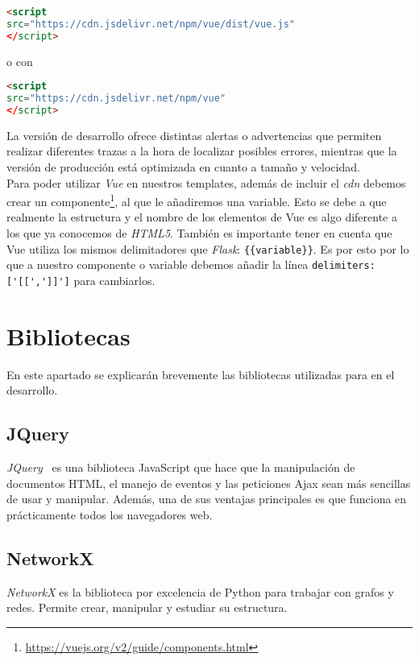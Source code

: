 \renewcommand{\lstlistingname}{Vue.js cdn}%
\renewcommand{\lstlistlistingname}{List of \lstlistingname s}
\begin{lstlisting}[language=html,caption={Versión de desarrollo.}]
<script
src="https://cdn.jsdelivr.net/npm/vue/dist/vue.js"
</script>
\end{lstlisting}
o con
\begin{lstlisting}[language=html,caption={Versión de producción.}]
<script
src="https://cdn.jsdelivr.net/npm/vue"
</script>
\end{lstlisting}
La versión de desarrollo ofrece distintas alertas o advertencias que permiten realizar diferentes trazas a la hora de localizar posibles errores, mientras que la versión de producción está optimizada en cuanto a tamaño y velocidad.
\\
Para poder utilizar \textit{Vue} en nuestros templates, además de incluir el \textit{cdn} debemos crear un componente\footnote{\url{https://vuejs.org/v2/guide/components.html}}, al que le añadiremos una variable. Esto se debe a que realmente la estructura y el nombre de los elementos de Vue es algo diferente a los que ya conocemos de \textit{HTML5}. También es importante tener en cuenta que Vue utiliza los mismos delimitadores que \textit{Flask}: \verb|{{variable}}|. Es por esto por lo que a nuestro componente o variable debemos añadir la línea \verb|delimiters:['[[',']]']| para cambiarlos.


\section{Bibliotecas}
En este apartado se explicarán brevemente las bibliotecas utilizadas para en el desarrollo.

\subsection{JQuery}
\textit{JQuery}~\cite{doc:jquery} es una biblioteca JavaScript que hace que la manipulación de documentos HTML, el manejo de eventos y las peticiones Ajax sean más sencillas de usar y manipular. Además, una de sus ventajas principales es que funciona en prácticamente todos los navegadores web.

\subsection{NetworkX}\label{sub:networkx}
\textit{NetworkX} es la biblioteca por excelencia de Python para trabajar con grafos y redes. Permite crear, manipular y estudiar su estructura.
\\

